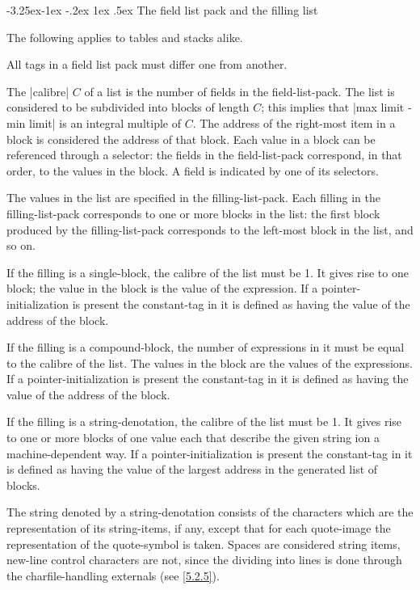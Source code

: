 \documentclass{article}
\makeatletter
\newcommand\g[1]{{\sf #1}}
\newcounter{subsubsubsection}[subsubsection]
\newcommand\subsubsubsection{%
\@startsection{subsubsubsection}{4}{\z@}%
   {-3.25ex\@plus -1ex \@minus -.2ex}%
   {1ex \@plus .5ex}%
   {\normalfont\normalsize\bfseries}}
\makeatother
\begin{document}
\subsubsubsection{The field list pack and the filling list}\label{4.1.5.2}

The following applies to tables and stacks alike.

\smallskip

All \g{tag}s in a \g{field list pack} must differ one from another.

The \pp|calibre| $C$ of a list is the number of \g{field}s in the
\g{field-list-pack}. The list is considered to be subdivided into blocks of length
$C$; this implies that \pp|max limit - min limit| is an integral multiple of
$C$. The address of the right-most item in a block is considered the address
of that block. Each value in a block can be referenced through a
\g{selector}: the \g{field}s in the \g{field-list-pack} correspond, in that
order, to the values in the block. A \g{field} is indicated by one of its
\g{selector}s.

The values in the list are specified in the \g{filling-list-pack}. Each
\g{filling} in the \g{filling-list-pack} corresponds to one or more blocks
in the list: the first block produced by the \g{filling-list-pack}
corresponds to the left-most block in the list,
and so on.

If the \g{filling} is a \g{single-block}, the calibre of the list must be 1.
It gives rise to one block; the value in the block is the value of the
\g{expression}. If a \g{pointer-initialization} is present the \g{constant-tag}
in it is defined as having the value of the address of the block.

If the \g{filling} is a \g{compound-block}, the number of \g{expression}s
in it must be equal to the calibre of the list. The values in the block are
the values of the \g{expression}s. If a \g{pointer-initialization} is present
the \g{constant-tag} in it is defined as having the value of the address of
the block.

If the \g{filling} is a \g{string-denotation}, the calibre of the list must
be 1. It gives rise to one or more blocks of one value each that describe the
given string ion a machine-dependent way. If a \g{pointer-initialization} is
present the \g{constant-tag} in it is defined as having the value of the
largest address in the generated list of blocks.

The string denoted by a \g{string-denotation} consists of the characters
which are the representation of its \g{string-item}s, if any, except that for
each \g{quote-image} the representation of the \g{quote-symbol} is taken.
Spaces are considered \g{string item}s, new-line control characters are not, 
since the dividing into
lines is done through the charfile-handling externals (see \ref{5.2.5}).
\end{document}

